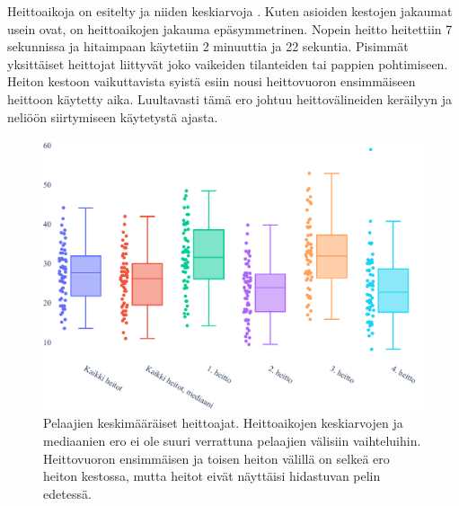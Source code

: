     Heittoaikoja on esitelty 
    ja niiden keskiarvoja .
    Kuten asioiden kestojen jakaumat usein ovat, on heittoaikojen jakauma epäsymmetrinen.
    Nopein heitto heitettiin 7 sekunnissa ja hitaimpaan käytetiin 2 minuuttia ja 22 sekuntia.
    Pisimmät yksittäiset heittojat liittyvät joko vaikeiden tilanteiden tai pappien pohtimiseen.
    Heiton kestoon vaikuttavista syistä esiin nousi heittovuoron ensimmäiseen heittoon käytetty aika.
    Luultavasti tämä ero johtuu heittovälineiden keräilyyn ja neliöön siirtymiseen käytetystä ajasta.

    \begin{figure}[!ht]
        \centering
        \includegraphics[width=\textwidth]{figures/keskiarvot1.pdf}
        \caption{
            Pelaajien keskimääräiset heittoajat.
            Heittoaikojen keskiarvojen ja mediaanien ero ei ole suuri verrattuna pelaajien välisiin vaihteluihin.
            Heittovuoron ensimmäisen ja toisen heiton välillä on selkeä ero heiton kestossa,
            mutta heitot eivät näyttäisi hidastuvan pelin edetessä.\label{fig:players}
        }
    \end{figure}
